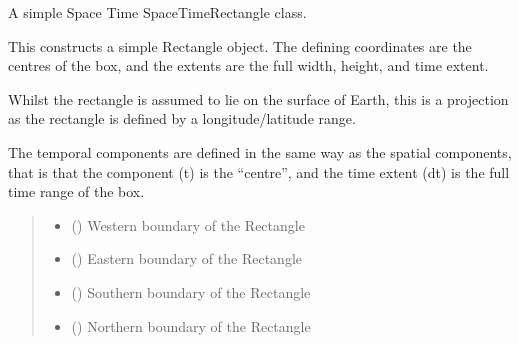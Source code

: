 \documentclass[letterpaper,10pt,english]{sphinxmanual}
\begin{document}

\begin{fulllineitems}
\label{\detokenize{users_guide:GeoSpatialTools.octtree.SpaceTimeRectangle}}
\pysigstartsignatures
{}
\pysigstopsignatures
\sphinxAtStartPar
A simple Space Time SpaceTimeRectangle class.

\sphinxAtStartPar
This constructs a simple Rectangle object.
The defining coordinates are the centres of the box, and the extents
are the full width, height, and time extent.

\sphinxAtStartPar
Whilst the rectangle is assumed to lie on the surface of Earth, this is
a projection as the rectangle is defined by a longitude/latitude range.

\sphinxAtStartPar
The temporal components are defined in the same way as the spatial
components, that is that the  component (t) is the “centre”, and
the time extent (dt) is the full time range of the box.
\begin{quote}\begin{description}
\begin{itemize}
\item {} 
\sphinxAtStartPar
{} () \textendash{} Western boundary of the Rectangle

\item {} 
\sphinxAtStartPar
{} () \textendash{} Eastern boundary of the Rectangle

\item {} 
\sphinxAtStartPar
{} () \textendash{} Southern boundary of the Rectangle

\item {} 
\sphinxAtStartPar
{} () \textendash{} Northern boundary of the Rectangle


\end{itemize}
\end{description}
\end{quote}
\end{fulllineitems}
\end{document}

